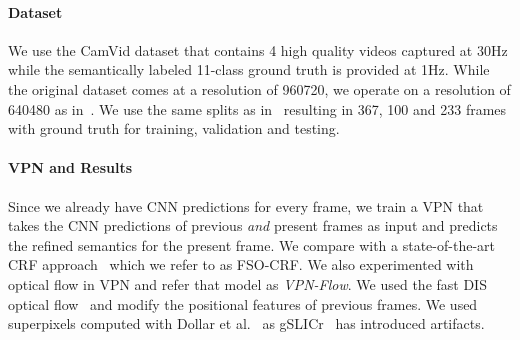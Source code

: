 \documentclass[10pt,twocolumn,letterpaper]{article}
\begin{document}
\vspace{-0.4cm}
\paragraph{Dataset} We use the CamVid dataset \cite{brostow2009semantic} that contains 4 high
quality videos captured at 30Hz while the semantically labeled 11-class ground truth is
provided at 1Hz. While the original dataset comes at a resolution of 960720,
we operate on a resolution of 640480 as in~\cite{yu2015multi,kundu2016feature}.
We use the same splits as in~\cite{sturgess2009combining} resulting in
367, 100 and 233 frames with ground truth for training, validation and testing.


\vspace{-0.4cm}
\paragraph{VPN and Results} Since we already have CNN predictions for every
frame, we train a VPN that takes the CNN predictions of previous \emph{and} present
frames as input and predicts the refined semantics for the present frame.
We compare with a state-of-the-art CRF approach~\cite{kundu2016feature}
which we refer to as FSO-CRF. We also experimented with
optical flow in VPN and refer that model as \emph{VPN-Flow}. We used the fast DIS
optical flow~\cite{kroeger2016fast} and modify the positional features of previous frames.
We used superpixels computed with Dollar et al.~\cite{dollariccv13edges} as
gSLICr~\cite{gSLICr_2015} has introduced artifacts.
\end{document}
